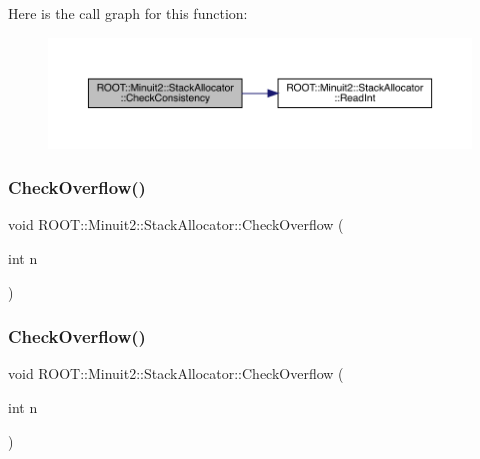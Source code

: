 Here is the call graph for this function\+:
\nopagebreak
\begin{figure}[H]
\begin{center}
\leavevmode
\includegraphics[width=350pt]{d3/d1e/classROOT_1_1Minuit2_1_1StackAllocator_ad1189cdc76a07c36ef1924ad2488797d_cgraph}
\end{center}
\end{figure}
\mbox{\label{classROOT_1_1Minuit2_1_1StackAllocator_a96a7565f7b4bb269f740901eef54a97e}} 
\subsubsection{\texorpdfstring{CheckOverflow()}{CheckOverflow()}\hspace{0.1cm}{\footnotesize\ttfamily [1/3]}}
{\footnotesize\ttfamily void R\+O\+O\+T\+::\+Minuit2\+::\+Stack\+Allocator\+::\+Check\+Overflow (\begin{DoxyParamCaption}\item[{int}]{n }\end{DoxyParamCaption})\hspace{0.3cm}{\ttfamily [inline]}}

\mbox{\label{classROOT_1_1Minuit2_1_1StackAllocator_a96a7565f7b4bb269f740901eef54a97e}} 
\subsubsection{\texorpdfstring{CheckOverflow()}{CheckOverflow()}\hspace{0.1cm}{\footnotesize\ttfamily [2/3]}}
{\footnotesize\ttfamily void R\+O\+O\+T\+::\+Minuit2\+::\+Stack\+Allocator\+::\+Check\+Overflow (\begin{DoxyParamCaption}\item[{int}]{n }\end{DoxyParamCaption})\hspace{0.3cm}{\ttfamily [inline]}}

